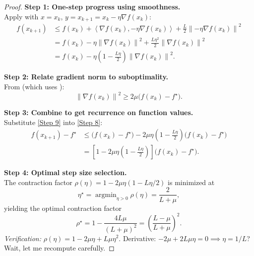 \documentclass{article}
\DeclareMathOperator{\argmin}{argmin}
\newcommand{\norm}[1]{\left\|#1\right\|}
\newcommand{\inner}[2]{\left\langle #1, #2 \right\rangle}
\newcommand{\stepsize}{\eta}
\newcommand{\lipschitz}{L}
\newcommand{\strongconvex}{\mu}
\newcommand{\grad}{\nabla}
\begin{document}
\begin{proof}
    \textbf{Step 1: One-step progress using smoothness.} \\
    Apply  with $x = x_k$, $y = x_{k+1} = x_k - \stepsize \grad f(x_k)$:
    \begin{align}
        f(x_{k+1}) &\le f(x_k) + \inner{\grad f(x_k)}{-\stepsize \grad f(x_k)} + \frac{\lipschitz}{2} \norm{-\stepsize \grad f(x_k)}^2 \\
        &= f(x_k) - \stepsize \norm{\grad f(x_k)}^2 + \frac{\lipschitz \stepsize^2}{2} \norm{\grad f(x_k)}^2 \\
        &= f(x_k) - \stepsize \left( 1 - \frac{\lipschitz \stepsize}{2} \right) \norm{\grad f(x_k)}^2. \tag{Step 8}
    \end{align}

    \textbf{Step 2: Relate gradient norm to suboptimality.} \\
    From  (which uses ):
    \begin{equation}
        \norm{\grad f(x_k)}^2 \ge 2\strongconvex \bigl( f(x_k) - f^\star \bigr). \tag{Step 9}
    \end{equation}

    \textbf{Step 3: Combine to get recurrence on function values.} \\
    Substitute \eqref{Step 9} into \eqref{Step 8}:
    \begin{align}
        f(x_{k+1}) - f^\star &\le \bigl( f(x_k) - f^\star \bigr) - 2\strongconvex \stepsize \left( 1 - \frac{\lipschitz \stepsize}{2} \right) \bigl( f(x_k) - f^\star \bigr) \\
        &= \left[ 1 - 2\strongconvex \stepsize \left( 1 - \frac{\lipschitz \stepsize}{2} \right) \right] \bigl( f(x_k) - f^\star \bigr). \tag{Step 10}
    \end{align}

    \textbf{Step 4: Optimal step size selection.} \\
    The contraction factor $\rho(\stepsize) = 1 - 2\strongconvex \stepsize (1 - \lipschitz \stepsize / 2)$ is minimized at
    \begin{equation}
        \stepsize^\star = \argmin_{\stepsize > 0} \rho(\stepsize) = \frac{2}{\lipschitz + \strongconvex}, \tag{Step 11}
    \end{equation}
    yielding the optimal contraction factor
    \begin{equation}
        \rho^\star = 1 - \frac{4\lipschitz\strongconvex}{(\lipschitz + \strongconvex)^2} = \left( \frac{\lipschitz - \strongconvex}{\lipschitz + \strongconvex} \right)^2. \tag{Step 12}
    \end{equation}
    \textit{Verification:} $\rho(\stepsize) = 1 - 2\strongconvex\stepsize + \lipschitz\strongconvex\stepsize^2$. Derivative: $-2\strongconvex + 2\lipschitz\strongconvex\stepsize = 0 \implies \stepsize = 1/\lipschitz$? Wait, let me recompute carefully.


\end{proof}
\end{document}
